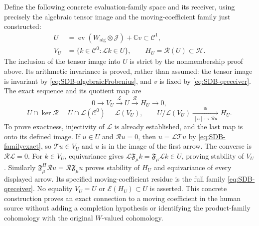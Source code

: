 Define the following concrete evaluation-family space and its
receiver, using precisely the algebraic tensor image and the
moving-coefficient family just constructed:
\begin{equation}\tag{SDB62}\label{eq:SDB-restrictedreceiver}
 \begin{aligned}
 U&=\operatorname{ev}(W_{\mathrm{alg}}\otimes\mathcal J)
                  +\mathbb C v\subset\mathcal C^1,\\
 V_U&=\{k\in\mathcal C^0:\mathcal Lk\in U\},\qquad
 H_U=\mathcal R(U)\subset\mathcal H.
 \end{aligned}
\end{equation}
The inclusion of the tensor image into $U$ is strict by the
nonmembership proof above. Its arithmetic invariance is proved,
rather than assumed: the tensor image is invariant by
\eqref{eq:SDB-algebraicFrobenius}, and $v$ is fixed by
\eqref{eq:SDB-qreceiver}. The exact sequence and its quotient map are
\begin{equation}\tag{SDB63}\label{eq:SDB-restrictedexact}
 0\longrightarrow V_U\xrightarrow{\mathcal L}U
       \xrightarrow{\mathcal R}H_U\longrightarrow0,
\end{equation}
\begin{equation}\tag{SDB64}\label{eq:SDB-restrictedkernel}
 U\cap\ker\mathcal R
     =U\cap\mathcal L(\mathcal C^0)=\mathcal L(V_U),\qquad
 U/\mathcal L(V_U)\xrightarrow[{\ [u]\mapsto\mathcal Ru\ }]
       {\ \cong\ }H_U.
\end{equation}
To prove exactness, injectivity of $\mathcal L$ is already established,
and the last map is onto its defined image. If $u\in U$ and
$\mathcal Ru=0$, then $u=\mathcal L\mathcal Tu$ by
\eqref{eq:SDB-familyexact}, so $\mathcal Tu\in V_U$ and $u$
is in the image of the first arrow. The converse is
$\mathcal R\mathcal L=0$.
For $k\in V_U$, equivariance gives
$\mathcal L\mathfrak F_\mu k=\mathfrak F_\mu\mathcal Lk\in U$,
proving stability of $V_U$. Similarly
$\mathfrak F_\mu^H\mathcal Ru=\mathcal R\mathfrak F_\mu u$
proves stability of $H_U$ and equivariance of every displayed arrow.
Its specified moving-coefficient residue is the full family
\eqref{eq:SDB-qreceiver}. No equality $V_U=U$ or
$\mathcal E(H_U)\subset U$ is asserted.
This concrete construction proves an exact connection to a moving
coefficient in the human source without adding a completion hypothesis
or identifying the product-family cohomology with the original
$W$-valued cohomology.
